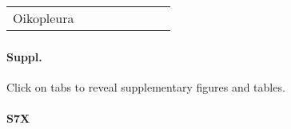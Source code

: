 \documentclass[
]{article}
\begin{document}
\begin{longtable}{lrrrrrrr}
\midrule\addlinespace[2.5pt]
\multicolumn{8}{l}{Verrucomicrobiota} \\ 
\midrule\addlinespace[2.5pt]
Oikopleura & \cellcolor[HTML]{F2F2F2}{\textcolor[HTML]{000000}{}} & \cellcolor[HTML]{F2F2F2}{\textcolor[HTML]{000000}{}} & \cellcolor[HTML]{FFFFFE}{\textcolor[HTML]{000000}{\textbf{+}}} & \cellcolor[HTML]{8357FF}{\textcolor[HTML]{000000}{\textbf{-}}} & \cellcolor[HTML]{FFE1D7}{\textcolor[HTML]{000000}{\textbf{+}}} & \cellcolor[HTML]{FF7E5D}{\textcolor[HTML]{000000}{\textbf{+}}} & \cellcolor[HTML]{F2F2F2}{\textcolor[HTML]{000000}{}} \\ 
\bottomrule
\end{longtable}

\subsubsection{}\label{section-6}

\paragraph{Suppl.}\label{suppl.-1}

Click on tabs to reveal supplementary figures and tables.

\paragraph{S7X}\label{s7x}

\newlength\holdLTleft\newlength\holdLTright\setlength\holdLTleft{\LTleft}\relax\setlength\holdLTright{\LTright}\relax\setlength{}

\setlength{}
\end{document}
